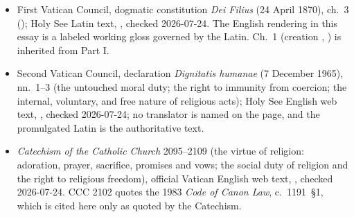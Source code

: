 {\fontsize{8.6}{9.6}\selectfont
\begin{itemize}[itemsep=0pt,parsep=0pt,topsep=0.05em]
\item First Vatican Council, dogmatic constitution \emph{Dei Filius} (24 April 1870), ch.~3 (); Holy See Latin text, , checked 2026-07-24. The English rendering in this essay is a labeled working gloss governed by the Latin. Ch.~1 (creation , ) is inherited from Part I.
\item Second Vatican Council, declaration \emph{Dignitatis humanae} (7 December 1965), nn.~1--3 (the untouched moral duty; the right to immunity from coercion; the internal, voluntary, and free nature of religious acts); Holy See English web text, , checked 2026-07-24; no translator is named on the page, and the promulgated Latin is the authoritative text.
\item \emph{Catechism of the Catholic Church} 2095--2109 (the virtue of religion: adoration, prayer, sacrifice, promises and vows; the social duty of religion and the right to religious freedom), official Vatican English web text, , checked 2026-07-24. CCC 2102 quotes the 1983 \emph{Code of Canon Law}, c.~1191~§1, which is cited here only as quoted by the Catechism.
\end{itemize}}

\endgroup
